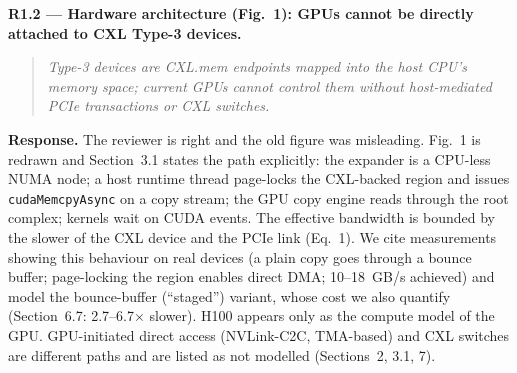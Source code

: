 \documentclass[11pt]{article}
\newcommand{\rc}[1]{\par\medskip\noindent\textbf{#1}}
\newenvironment{comment}{\begin{quote}\itshape}{\end{quote}}
\begin{document}
\rc{R1.2 --- Hardware architecture (Fig.~1): GPUs cannot be directly attached to CXL Type-3 devices.}
\begin{comment}Type-3 devices are CXL.mem endpoints mapped into the host CPU's memory space; current GPUs cannot control them without host-mediated PCIe transactions or CXL switches.\end{comment}
\textbf{Response.} The reviewer is right and the old figure was misleading. Fig.~1 is redrawn and Section~3.1 states the path explicitly: the expander is a CPU-less NUMA node; a host runtime thread page-locks the CXL-backed region and issues \texttt{cudaMemcpyAsync} on a copy stream; the GPU copy engine reads through the root complex; kernels wait on CUDA events. The effective bandwidth is bounded by the slower of the CXL device and the PCIe link (Eq.~1). We cite measurements showing this behaviour on real devices (a plain copy goes through a bounce buffer; page-locking the region enables direct DMA; 10--18~GB/s achieved) and model the bounce-buffer (``staged'') variant, whose cost we also quantify (Section~6.7: 2.7--6.7$\times$ slower). H100 appears only as the compute model of the GPU. GPU-initiated direct access (NVLink-C2C, TMA-based) and CXL switches are different paths and are listed as not modelled (Sections~2, 3.1, 7).
\end{document}
